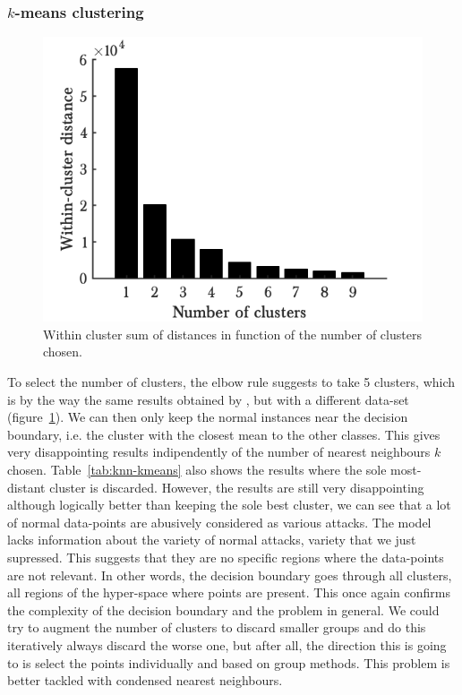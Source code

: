\subsubsection{$k$-means clustering}
\begin{figure}
\begin{center}
    \includegraphics[width=.45\textwidth]{parts/chap-4/img-knn/kmeans.png}
    \caption{Within cluster sum of distances in function of the number of clusters chosen.}
    \label{fig:kmeans}
\end{center}
\end{figure}
To select the number of clusters, the elbow rule suggests to take 5 clusters, which is by the way the same results obtained by \cite{Soheily-Khah2018IntrusionDataset}, but with a different data-set (figure~\ref{fig:kmeans}). We can then only keep the normal instances near the decision boundary, i.e. the cluster with the closest mean to the other classes. This gives very disappointing results indipendently of the number of nearest neighbours $k$ chosen. Table~\ref{tab:knn-kmeans} also shows the results where the sole most-distant cluster is discarded. However, the results are still very disappointing although logically better than keeping the sole best cluster, we can see that a lot of normal data-points are abusively considered as various attacks. The model lacks information about the variety of normal attacks, variety that we just supressed.
This suggests that they are no specific regions where the data-points are not relevant. In other words, the decision boundary goes through all clusters, all regions of the hyper-space where points are present. This once again confirms the complexity of the decision boundary and the problem in general. We could try to augment the number of clusters to discard smaller groups and do this iteratively always discard the worse one, but after all, the direction this is going to is select the points individually and based on group methods. This problem is better tackled with condensed nearest neighbours.


